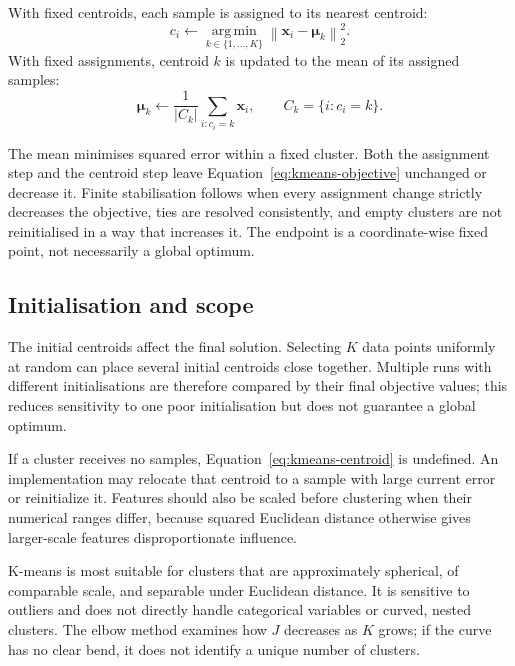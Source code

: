With fixed centroids, each sample is assigned to its nearest centroid:
\begin{equation}
    c_i
    \leftarrow
    \operatorname*{arg\,min}_{k\in\{1,\ldots,K\}}
    \left\lVert
    \mathbf{x}_i-\boldsymbol{\mu}_k
    \right\rVert_2^2.
    \label{eq:kmeans-assignment}
\end{equation}
With fixed assignments, centroid \(k\) is updated to the mean of its assigned samples:
\begin{equation}
    \boldsymbol{\mu}_k
    \leftarrow
    \frac{1}{|C_k|}
    \sum_{i:c_i=k}\mathbf{x}_i,
    \qquad
    C_k=\{i:c_i=k\}.
    \label{eq:kmeans-centroid}
\end{equation}

\KmeansIterationElbowFigure

The mean minimises squared error within a fixed cluster. Both the assignment
step and the centroid step leave Equation~\eqref{eq:kmeans-objective} unchanged
or decrease it. Finite stabilisation follows when every assignment change
strictly decreases the objective, ties are resolved consistently, and empty
clusters are not reinitialised in a way that increases it. The endpoint is a
coordinate-wise fixed point, not necessarily a global optimum.

\subsection{Initialisation and scope}

The initial centroids affect the final solution. Selecting \(K\) data points
uniformly at random can place several initial centroids close together.
Multiple runs with different initialisations are therefore compared by their
final objective values; this reduces sensitivity to one poor initialisation but
does not guarantee a global optimum.

If a cluster receives no samples, Equation~\eqref{eq:kmeans-centroid} is undefined. An implementation may relocate that centroid to a sample with large current error or reinitialize it. Features should also be scaled before clustering when their numerical ranges differ, because squared Euclidean distance otherwise gives larger-scale features disproportionate influence.

K-means is most suitable for clusters that are approximately spherical, of comparable scale, and separable under Euclidean distance. It is sensitive to outliers and does not directly handle categorical variables or curved, nested clusters. The elbow method examines how \(J\) decreases as \(K\) grows; if the curve has no clear bend, it does not identify a unique number of clusters.

